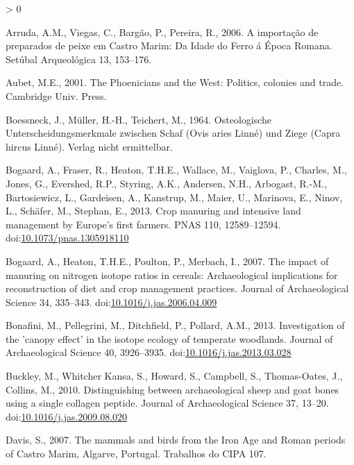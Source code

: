 \documentclass[5p]{elsarticle} %
\newlength{\cslhangindent}
\newenvironment{CSLReferences}[2] %
 {%
  \setlength{\parindent}{0pt}
  \ifodd #1 \everypar{\setlength{\hangindent}{\cslhangindent}}\ignorespaces\fi
  \ifnum #2 > 0
  \setlength{\parskip}{#2\baselineskip}
  \fi
 }%
 {}
\begin{document}
\begin{CSLReferences}{1}{0}
\leavevmode\hypertarget{ref-arruda_etal06}{}%
Arruda, A.M., Viegas, C., Bargão, P., Pereira, R., 2006. A importação de preparados de peixe em {Castro Marim}: Da {Idade} do {Ferro} á {Época Romana}. Setúbal Arqueológica 13, 153--176.

\leavevmode\hypertarget{ref-aubet01}{}%
Aubet, M.E., 2001. The {Phoenicians} and the {West}: Politics, colonies and trade. {Cambridge Univ. Press}.

\leavevmode\hypertarget{ref-boessneck_etal64}{}%
Boessneck, J., Müller, H.-H., Teichert, M., 1964. Osteologische {Unterscheidungsmerkmale} zwischen {Schaf} ({Ovis} aries {Linné}) und {Ziege} ({Capra} hircus {Linné}). {Verlag nicht ermittelbar}.

\leavevmode\hypertarget{ref-bogaard_etal13}{}%
Bogaard, A., Fraser, R., Heaton, T.H.E., Wallace, M., Vaiglova, P., Charles, M., Jones, G., Evershed, R.P., Styring, A.K., Andersen, N.H., Arbogast, R.-M., Bartosiewicz, L., Gardeisen, A., Kanstrup, M., Maier, U., Marinova, E., Ninov, L., Schäfer, M., Stephan, E., 2013. Crop manuring and intensive land management by {Europe}'s first farmers. PNAS 110, 12589--12594. doi:\href{https://doi.org/10.1073/pnas.1305918110}{10.1073/pnas.1305918110}

\leavevmode\hypertarget{ref-bogaard_etal07}{}%
Bogaard, A., Heaton, T.H.E., Poulton, P., Merbach, I., 2007. The impact of manuring on nitrogen isotope ratios in cereals: Archaeological implications for reconstruction of diet and crop management practices. Journal of Archaeological Science 34, 335--343. doi:\href{https://doi.org/10.1016/j.jas.2006.04.009}{10.1016/j.jas.2006.04.009}

\leavevmode\hypertarget{ref-bonafini_etal13}{}%
Bonafini, M., Pellegrini, M., Ditchfield, P., Pollard, A.M., 2013. Investigation of the 'canopy effect' in the isotope ecology of temperate woodlands. Journal of Archaeological Science 40, 3926--3935. doi:\href{https://doi.org/10.1016/j.jas.2013.03.028}{10.1016/j.jas.2013.03.028}

\leavevmode\hypertarget{ref-buckley_etal10}{}%
Buckley, M., Whitcher Kansa, S., Howard, S., Campbell, S., Thomas-Oates, J., Collins, M., 2010. Distinguishing between archaeological sheep and goat bones using a single collagen peptide. Journal of Archaeological Science 37, 13--20. doi:\href{https://doi.org/10.1016/j.jas.2009.08.020}{10.1016/j.jas.2009.08.020}

\leavevmode\hypertarget{ref-davis07}{}%
Davis, S., 2007. The mammals and birds from the {Iron Age} and {Roman} periods of {Castro Marim}, {Algarve}, {Portugal}. Trabalhos do CIPA 107.


\end{CSLReferences}
\end{document}
